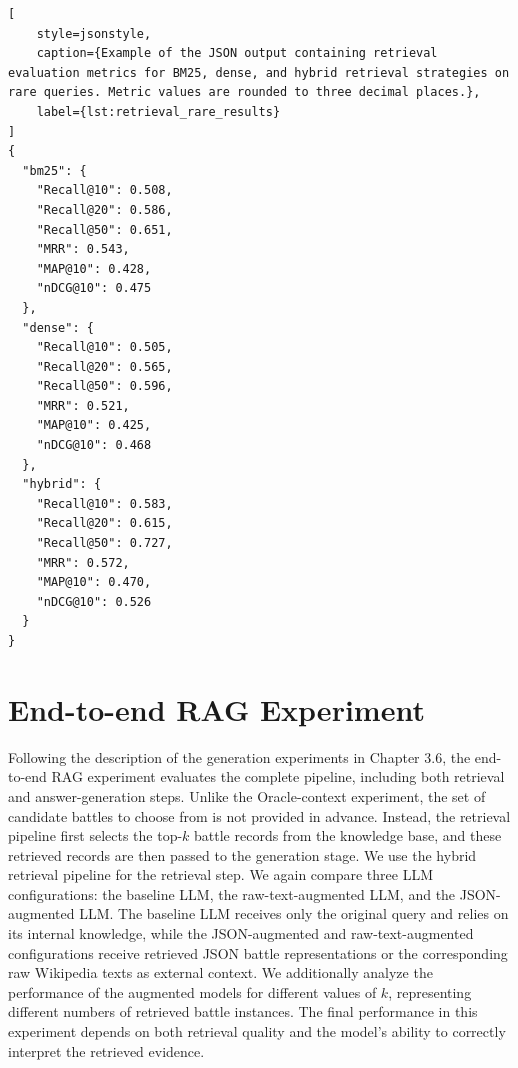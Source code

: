 \begin{minipage}{\textwidth}
\begin{lstlisting}[
    style=jsonstyle,
    caption={Example of the JSON output containing retrieval evaluation metrics for BM25, dense, and hybrid retrieval strategies on rare queries. Metric values are rounded to three decimal places.},
    label={lst:retrieval_rare_results}
]
{
  "bm25": {
    "Recall@10": 0.508,
    "Recall@20": 0.586,
    "Recall@50": 0.651,
    "MRR": 0.543,
    "MAP@10": 0.428,
    "nDCG@10": 0.475
  },
  "dense": {
    "Recall@10": 0.505,
    "Recall@20": 0.565,
    "Recall@50": 0.596,
    "MRR": 0.521,
    "MAP@10": 0.425,
    "nDCG@10": 0.468
  },
  "hybrid": {
    "Recall@10": 0.583,
    "Recall@20": 0.615,
    "Recall@50": 0.727,
    "MRR": 0.572,
    "MAP@10": 0.470,
    "nDCG@10": 0.526
  }
}
\end{lstlisting}
\end{minipage}

\section{End-to-end RAG Experiment}
Following the description of the generation experiments in Chapter 3.6, the end-to-end RAG experiment evaluates the complete pipeline, including both retrieval and answer-generation steps. Unlike the Oracle-context experiment, the set of candidate battles to choose from is not provided in advance. Instead, the retrieval pipeline first selects the top-$k$ battle records from the knowledge base, and these retrieved records are then passed to the generation stage. We use the hybrid retrieval pipeline for the retrieval step. We again compare three LLM configurations: the baseline LLM, the raw-text-augmented LLM, and the JSON-augmented LLM. The baseline LLM receives only the original query and relies on its internal knowledge, while the JSON-augmented and raw-text-augmented configurations receive retrieved JSON battle representations or the corresponding raw Wikipedia texts as external context. We additionally analyze the performance of the augmented models for different values of $k$, representing different numbers of retrieved battle instances. The final performance in this experiment depends on both retrieval quality and the model’s ability to correctly interpret the retrieved evidence.

